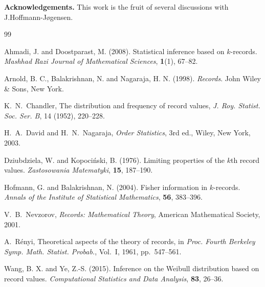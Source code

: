 \documentclass[12pt]{article}
\theoremstyle{definition}
\begin{document}
\medskip

\noindent
\textbf{Acknowledgements.}
This work is the fruit of several discussions with J.Hoffmann-J{\o}gensen.

\begin{thebibliography}{99}

Ahmadi, J. and Doostparast, M. (2008).
Statistical inference based on $k$-records.
\textit{Mashhad Razi Journal of Mathematical Sciences}, \textbf{1}(1), 67--82.


Arnold, B. C., Balakrishnan, N. and Nagaraja, H. N. (1998).
\textit{Records}.
John Wiley \& Sons, New York.

K.~N.~Chandler,
The distribution and frequency of record values,
\emph{J. Roy. Statist. Soc. Ser. B}, 14 (1952), 220--228.

H.~A.~David and H.~N.~Nagaraja,
\emph{Order Statistics}, 3rd ed.,
Wiley, New York, 2003.

Dziubdziela, W. and Kopoci\'nski, B. (1976).
Limiting properties of the $k$th record values.
\textit{Zastosowania Matematyki}, \textbf{15}, 187--190.

Hofmann, G. and Balakrishnan, N. (2004).
Fisher information in $k$-records.
\textit{Annals of the Institute of Statistical Mathematics}, \textbf{56}, 383--396.

V.~B.~Nevzorov,
\emph{Records: Mathematical Theory},
American Mathematical Society, 2001.

A.~Rényi,
Theoretical aspects of the theory of records,
in \emph{Proc. Fourth Berkeley Symp. Math. Statist. Probab.}, Vol.~I, 1961, pp.~547--561.

Wang, B. X. and Ye, Z.-S. (2015).
Inference on the Weibull distribution based on record values.
\textit{Computational Statistics and Data Analysis}, \textbf{83}, 26--36.

\end{thebibliography}
\end{document}
